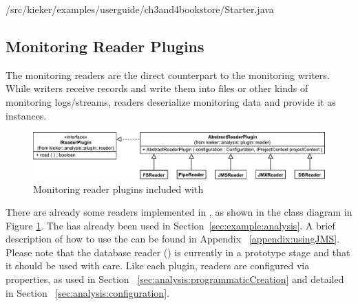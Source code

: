 \medskip

\setJavaCodeListing
%
{\customComponentsBookstoreApplicationDir/src/kieker/examples/userguide/ch3and4bookstore/Starter.java}

\enlargethispage{0.5cm}

\subsection{Monitoring Reader Plugins}

The monitoring readers are the direct counterpart to the monitoring %
writers. While writers receive records and write them into files or other kinds %
of monitoring logs/streams, readers deserialize monitoring data and provide it as %
 instances.

\begin{figure}\centering
\includegraphics[scale=0.7]{images/kieker_readerimplsuserguide-modified}
\caption{Monitoring reader plugins included with \Kieker{}}
\label{Figure:ReaderHierarchy}
\end{figure}


%
%


\noindent There are already some readers implemented in \Kieker,  as shown in the %
class diagram in Figure \ref{Figure:ReaderHierarchy}. %
The  has already been used in Section~\ref{sec:example:analysis}. %
A brief description of how to use the  can be found in Appendix~%
\ref{appendix:usingJMS}. Please note that the database reader () %
is currently in a prototype stage and that it should be used with care. %
Like each plugin, readers are configured via properties, as used in Section~%
\ref{sec:analysis:programmaticCreation} and detailed in Section~%
\ref{sec:analysis:configuration}.

